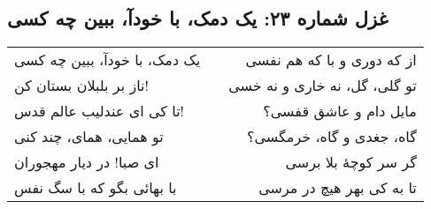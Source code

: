 \begin{center}
\section*{غزل شماره ۲۳: یک دمک، با خودآ، ببین چه کسی}
\label{sec:023}
\begin{longtable}{l p{0.5cm} r}
یک دمک، با خودآ، ببین چه کسی
&&
از که دوری و با که هم نفسی
\\
ناز بر بلبلان بستان کن!
&&
تو گلی، گل، نه خاری و نه خسی
\\
تا کی ای عندلیب عالم قدس!
&&
مایل دام و عاشق قفسی؟
\\
تو همایی، همای، چند کنی
&&
گاه، جغدی و گاه، خرمگسی؟
\\
ای صبا! در دیار مهجوران
&&
گر سر کوچهٔ بلا برسی
\\
با بهائی بگو که با سگ نفس
&&
تا به کی بهر هیچ در مرسی
\\
\end{longtable}
\end{center}
